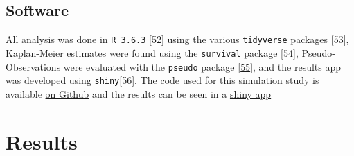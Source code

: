 \documentclass[12pt,PhD,twoside,openright]{muthesis}
\begin{document}
\hypertarget{software}{%
\subsection{Software}\label{software}}

All analysis was done in \texttt{R\ 3.6.3} {[}\protect\hyperlink{ref-r_core_team_r_nodate}{52}{]} using the various \texttt{tidyverse} packages {[}\protect\hyperlink{ref-wickham_tidy_2017}{53}{]}, Kaplan-Meier estimates were found using the \texttt{survival} package {[}\protect\hyperlink{ref-therneau_package_2020}{54}{]}, Pseudo-Observations were evaluated with the \texttt{pseudo} package {[}\protect\hyperlink{ref-perme_pseudo_2017}{55}{]}, and the results app was developed using \texttt{shiny}{[}\protect\hyperlink{ref-chang_shiny_2020}{56}{]}. The code used for this simulation study is available \href{https://github.com/MyKo101/IPCW-Logistic}{on Github} and the results can be seen in a \href{https://michael-barrowman.shinyapps.io/IPCW_Calibrations/?_ga=2.129261196.1072091615.1588464259-38998367.1584541320}{shiny app}

\hypertarget{results-3}{%
\section{Results}\label{results-3}}
\end{document}
